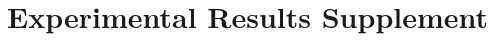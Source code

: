\documentclass{article}
\begin{document}



\section{Experimental Results Supplement} \label{sec-app:experiment appendix}
\end{document}
